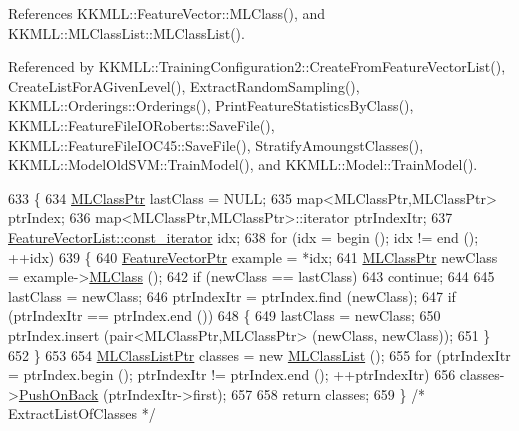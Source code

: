 References K\+K\+M\+L\+L\+::\+Feature\+Vector\+::\+M\+L\+Class(), and K\+K\+M\+L\+L\+::\+M\+L\+Class\+List\+::\+M\+L\+Class\+List().



Referenced by K\+K\+M\+L\+L\+::\+Training\+Configuration2\+::\+Create\+From\+Feature\+Vector\+List(), Create\+List\+For\+A\+Given\+Level(), Extract\+Random\+Sampling(), K\+K\+M\+L\+L\+::\+Orderings\+::\+Orderings(), Print\+Feature\+Statistics\+By\+Class(), K\+K\+M\+L\+L\+::\+Feature\+File\+I\+O\+Roberts\+::\+Save\+File(), K\+K\+M\+L\+L\+::\+Feature\+File\+I\+O\+C45\+::\+Save\+File(), Stratify\+Amoungst\+Classes(), K\+K\+M\+L\+L\+::\+Model\+Old\+S\+V\+M\+::\+Train\+Model(), and K\+K\+M\+L\+L\+::\+Model\+::\+Train\+Model().


\begin{DoxyCode}
633 \{
634   \hyperlink{class_k_k_m_l_l_1_1_m_l_class}{MLClassPtr}  lastClass = NULL;
635   map<MLClassPtr,MLClassPtr>  ptrIndex;
636   map<MLClassPtr,MLClassPtr>::iterator  ptrIndexItr;
637   \hyperlink{class_k_k_b_1_1_k_k_queue_aeb057c9c010446f46f57c1e355f981f1}{FeatureVectorList::const\_iterator}  idx;
638   \textcolor{keywordflow}{for}  (idx = begin ();  idx != end ();  ++idx)
639   \{
640     \hyperlink{class_k_k_m_l_l_1_1_feature_vector}{FeatureVectorPtr} example = *idx;
641     \hyperlink{class_k_k_m_l_l_1_1_m_l_class}{MLClassPtr}  newClass = example->\hyperlink{class_k_k_m_l_l_1_1_feature_vector_a3c8fe002c6e868f8c00059c004fb32fd}{MLClass} ();
642     \textcolor{keywordflow}{if}  (newClass == lastClass)
643       \textcolor{keywordflow}{continue};
644 
645     lastClass  = newClass;
646     ptrIndexItr = ptrIndex.find (newClass);
647     \textcolor{keywordflow}{if}  (ptrIndexItr == ptrIndex.end ())
648     \{
649       lastClass = newClass;
650       ptrIndex.insert (pair<MLClassPtr,MLClassPtr> (newClass, newClass));
651     \}
652   \}
653 
654   \hyperlink{class_k_k_m_l_l_1_1_m_l_class_list}{MLClassListPtr}  classes = \textcolor{keyword}{new} \hyperlink{class_k_k_m_l_l_1_1_m_l_class_list}{MLClassList} ();
655   \textcolor{keywordflow}{for}  (ptrIndexItr = ptrIndex.begin ();  ptrIndexItr != ptrIndex.end ();  ++ptrIndexItr)
656     classes->\hyperlink{class_k_k_m_l_l_1_1_m_l_class_list_ae46d4f51c041d7d4d544bf514c484295}{PushOnBack} (ptrIndexItr->first);
657 
658   \textcolor{keywordflow}{return}   classes;
659 \}  \textcolor{comment}{/* ExtractListOfClasses */}
\end{DoxyCode}
